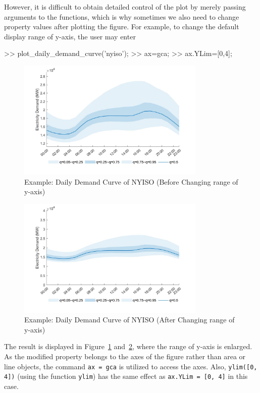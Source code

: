 \documentclass[10pt]{article}
\numberwithin{equation}{section}
\numberwithin{table}{section}
\numberwithin{figure}{section}
\begin{document}
However, it is difficult to obtain detailed control of the plot by merely passing arguments to the functions, which is why sometimes we also need to change property values after plotting the figure. For example, to change the default display range of y-axis, the user may enter

\begin{Command}
>> plot_daily_demand_curve('nyiso');
>> ax=gca;
>> ax.YLim=[0,4];
\end{Command}

\begin{figure}
  \centering
  \noindent\includegraphics[width=0.8\textwidth]{figures/visualization_example5_1.jpg}
  \caption{Example: Daily Demand Curve of NYISO (Before Changing range of y-axis)} \label{fig:vis_eg5_1}
\end{figure}

\begin{figure}
  \centering
  \noindent\includegraphics[width=0.8\textwidth]{figures/visualization_example5_2.jpg}
  \caption{Example: Daily Demand Curve of NYISO (After Changing range of y-axis)} \label{fig:vis_eg5_2}
\end{figure}

The result is displayed in Figure~\ref{fig:vis_eg5_1} and~\ref{fig:vis_eg5_2}, where the range of y-axis is enlarged. As the modified property belongs to the axes of the figure rather than area or line objects, the command \verb!ax = gca! is utilized to access the axes. Also, \verb!ylim([0, 4])! (using the function \verb!ylim!) has the same effect as \verb!ax.YLim = [0, 4]! in this case.
\end{document}
